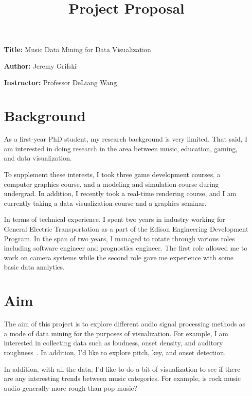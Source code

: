 \documentclass[12pt, a4paper]{article}
\title{Project Proposal}
\author{}
\date{}
\newcommand{\namelistlabel}[1]{\mbox{#1}\hfil}
\newenvironment{namelist}[1]{%
\begin{list}{}
    {
        \let\makelabel\namelistlabel
        \settowidth{\labelwidth}{#1}
        \setlength{\leftmargin}{1.1\labelwidth}
    }
  }{%
\end{list}}
\begin{document}
\maketitle

\begin{namelist}{xxxxxxxxxxxx}
\item[{\bf Title:}]
	Music Data Mining for Data Visualization
\item[{\bf Author:}]
	Jeremy Grifski
\item[{\bf Instructor:}]
	Professor DeLiang Wang
\end{namelist}

\section*{Background}

As a first-year PhD student, my research background is very limited. That said,
I am interested in doing research in the area between music, education, gaming,
and data visualization.

To supplement these interests, I took three game development courses, a
computer graphics course, and a modeling and simulation course during undergrad.
In addition, I recently took a real-time rendering course, and I am
currently taking a data visualization course and a graphics seminar.

In terms of technical experience, I spent two years in industry working for
General Electric Transportation as a part of the Edison Engineering Development
Program. In the span of two years, I managed to rotate through various roles
including software engineer and prognostics engineer. The first role allowed
me to work on camera systems while the second role gave me experience with
some basic data analytics.

\section*{Aim}

The aim of this project is to explore different audio signal processing methods
as a mode of data mining for the purposes of visualization. For example, I am
interested in collecting data such as loudness, onset density, and auditory
roughness~\cite{knuth}. In addition, I'd like to explore pitch, key, and onset
detection.

In addition, with all the data, I'd like to do a bit of visualization to see
if there are any interesting trends between music categories. For example,
is rock music audio generally more rough than pop music?
\end{document}
